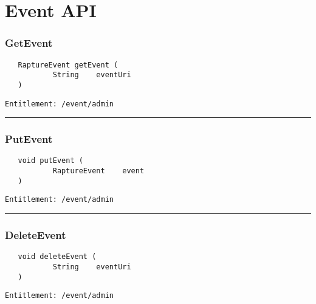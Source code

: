 \chapter{Event API}

\subsection{GetEvent}
\label{Api:GetEvent}
\begin{Verbatim}
   RaptureEvent getEvent (
           String    eventUri
   )
\end{Verbatim}
\begin{Verbatim}[formatcom=\color{Maroon}]
  Entitlement: /event/admin
\end{Verbatim}



\rule{12cm}{2pt}
\subsection{PutEvent}
\label{Api:PutEvent}
\begin{Verbatim}
   void putEvent (
           RaptureEvent    event
   )
\end{Verbatim}
\begin{Verbatim}[formatcom=\color{Maroon}]
  Entitlement: /event/admin
\end{Verbatim}



\rule{12cm}{2pt}
\subsection{DeleteEvent}
\label{Api:DeleteEvent}
\begin{Verbatim}
   void deleteEvent (
           String    eventUri
   )
\end{Verbatim}
\begin{Verbatim}[formatcom=\color{Maroon}]
  Entitlement: /event/admin
\end{Verbatim}



